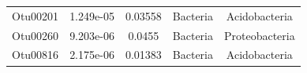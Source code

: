 \documentclass[]{article}
\begin{document}
\begin{longtable}[]{@{}ccccc@{}}
\begin{minipage}[t]{0.13\columnwidth}\centering\strut
Otu00201\strut
\end{minipage} & \begin{minipage}[t]{0.14\columnwidth}\centering\strut
1.249e-05\strut
\end{minipage} & \begin{minipage}[t]{0.12\columnwidth}\centering\strut
0.03558\strut
\end{minipage} & \begin{minipage}[t]{0.13\columnwidth}\centering\strut
Bacteria\strut
\end{minipage} & \begin{minipage}[t]{0.19\columnwidth}\centering\strut
Acidobacteria\strut
\end{minipage}\tabularnewline
\begin{minipage}[t]{0.13\columnwidth}\centering\strut
Otu00260\strut
\end{minipage} & \begin{minipage}[t]{0.14\columnwidth}\centering\strut
9.203e-06\strut
\end{minipage} & \begin{minipage}[t]{0.12\columnwidth}\centering\strut
0.0455\strut
\end{minipage} & \begin{minipage}[t]{0.13\columnwidth}\centering\strut
Bacteria\strut
\end{minipage} & \begin{minipage}[t]{0.19\columnwidth}\centering\strut
Proteobacteria\strut
\end{minipage}\tabularnewline
\begin{minipage}[t]{0.13\columnwidth}\centering\strut
Otu00816\strut
\end{minipage} & \begin{minipage}[t]{0.14\columnwidth}\centering\strut
2.175e-06\strut
\end{minipage} & \begin{minipage}[t]{0.12\columnwidth}\centering\strut
0.01383\strut
\end{minipage} & \begin{minipage}[t]{0.13\columnwidth}\centering\strut
Bacteria\strut
\end{minipage} & \begin{minipage}[t]{0.19\columnwidth}\centering\strut
Acidobacteria\strut
\end{minipage}\tabularnewline
\bottomrule
\end{longtable}
\end{document}
